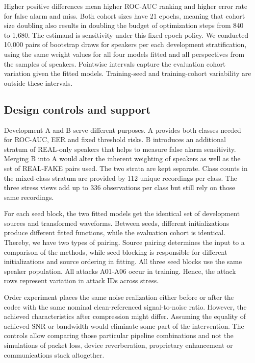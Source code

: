 Higher positive differences mean higher ROC-AUC ranking and higher error rate for false alarm and miss. Both cohort sizes have 21 epochs, meaning that cohort size doubling also results in doubling the budget of optimization steps from 840 to 1,680. The estimand is sensitivity under this fixed-epoch policy. We conducted 10,000 pairs of bootstrap draws for speakers per each development stratification, using the same weight values for all four models fitted and all perspectives from the samples of speakers. Pointwise intervals capture the evaluation cohort variation given the fitted models. Training-seed and training-cohort variability are outside these intervals.

\subsection{Design controls and support}

Development A and B serve different purposes. A provides both classes needed for ROC-AUC, EER and fixed threshold risks. B introduces an additional stratum of REAL-only speakers that helps to measure false alarm sensitivity. Merging B into A would alter the inherent weighting of speakers as well as the set of REAL-FAKE pairs used. The two strata are kept separate. Class counts in the mixed-class stratum are provided by 112 unique recordings per class. The three stress views add up to 336 observations per class but still rely on those same recordings.

For each seed block, the two fitted models get the identical set of development sources and transformed waveforms. Between seeds, different initializations produce different fitted functions, while the evaluation cohort is identical. Thereby, we have two types of pairing. Source pairing determines the input to a comparison of the methods, while seed blocking is responsible for different initializations and source ordering in fitting. All three seed blocks use the same speaker population. All attacks A01-A06 occur in training. Hence, the attack rows represent variation in attack IDs across stress.

Order experiment places the same noise realization either before or after the codec with the same nominal clean-referenced signal-to-noise ratio. However, the achieved characteristics after compression might differ. Assuming the equality of achieved SNR or bandwidth would eliminate some part of the intervention. The controls allow comparing those particular pipeline combinations and not the simulations of packet loss, device reverberation, proprietary enhancement or communications stack altogether.


